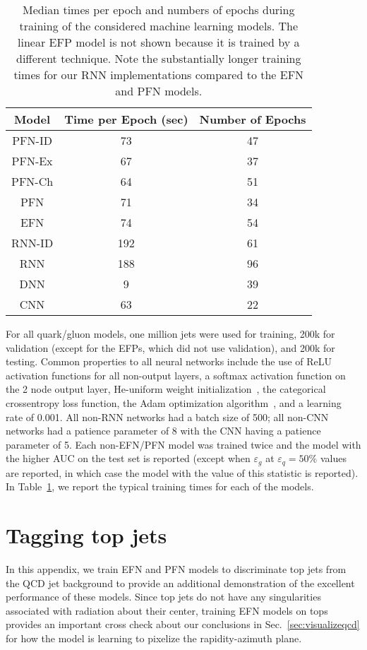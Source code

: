 \documentclass[letterpaper,11pt]{article}
\DeclareRobustCommand{\Sec}[1]{Sec.~\ref{#1}}
\DeclareRobustCommand{\Tab}[1]{Table~\ref{#1}}
\begin{document}
\begin{table}[t]
\centering
\begin{tabular}{|c|c|c|}
\hline
\textbf{Model} & \textbf{Time per Epoch (sec)} & \textbf{Number of Epochs} \\
\hline\hline
PFN-ID & 73 & 47 \\
PFN-Ex & 67 & 37 \\
PFN-Ch & 64 & 51 \\
PFN & 71 & 34 \\
EFN & 74 & 54 \\
\hline
RNN-ID & 192 & 61 \\ 
RNN & 188 & 96 \\
DNN & 9 & 39 \\
CNN & 63 & 22 \\
\hline
\end{tabular}
\caption{
Median times per epoch and numbers of epochs during training of the considered machine learning models.
%
The linear EFP model is not shown because it is trained by a different technique.
%
Note the substantially longer training times for our RNN implementations compared to the EFN and PFN models.
}
\label{tab:timing}
\end{table}


For all quark/gluon models, one million jets were used for training, 200k for validation (except for the EFPs, which did not use validation), and 200k for testing.
%
Common properties to all neural networks include the use of ReLU~\cite{relu} activation functions for all non-output layers, a softmax activation function on the 2 node output layer, He-uniform weight initialization~\cite{heuniform}, the categorical crossentropy loss function, the Adam optimization algorithm~\cite{adam}, and a learning rate of 0.001.
%
All non-RNN networks had a batch size of 500; all non-CNN networks had a patience parameter of 8 with the CNN having a patience parameter of 5.
%
Each non-EFN/PFN model was trained twice and the model with the higher AUC on the test set is reported (except when $\varepsilon_g$ at $\varepsilon_q=50\%$ values are reported, in which case the model with the value of this statistic is reported).
%
In \Tab{tab:timing}, we report the typical training times for each of the models.


\section{Tagging top jets}
\label{app:toptag}


In this appendix, we train EFN and PFN models to discriminate top jets from the QCD jet background to provide an additional demonstration of the excellent performance of these models.
%
Since top jets do not have any singularities associated with radiation about their center, training EFN models on tops provides an important cross check about our conclusions in \Sec{sec:visualizeqcd} for how the model is learning to pixelize the rapidity-azimuth plane.
\end{document}
